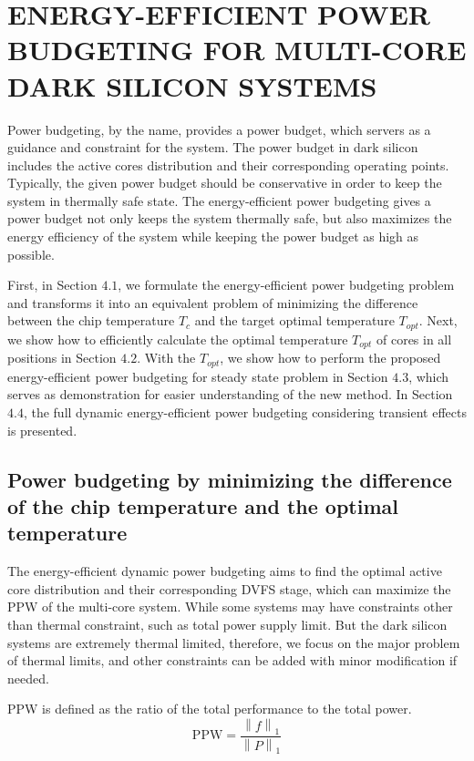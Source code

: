 \section{ENERGY-EFFICIENT POWER BUDGETING FOR MULTI-CORE DARK SILICON SYSTEMS}

Power budgeting, by the name, provides a power budget, which servers as a guidance and constraint for the system. The power budget in dark silicon includes the active cores distribution and their corresponding operating points. Typically, the given power budget should be conservative in order to keep the system in thermally safe state. The energy-efficient power budgeting gives a power budget not only keeps the system thermally safe, but also maximizes the energy efficiency of the system while keeping the power budget as high as possible. 

First, in Section $4.1$, we formulate the energy-efficient power budgeting problem and transforms it into an equivalent problem of minimizing the difference between the chip temperature $T_{c}$ and the target optimal temperature $T_{opt}$. Next, we show how to efficiently calculate the optimal temperature $T_{opt}$ of cores in all positions in Section $4.2$. With the $T_{opt}$, we show how to perform the proposed energy-efficient power budgeting for steady state problem in Section $4.3$, which serves as demonstration for easier understanding of the new method. In Section $4.4$, the full dynamic energy-efficient power budgeting considering transient effects is presented.

\subsection{Power budgeting by minimizing the difference of the chip temperature and the optimal temperature}
The energy-efficient dynamic power budgeting aims to find the optimal active core distribution and their corresponding DVFS stage, which can maximize the PPW of the multi-core system. While some systems may have constraints other than thermal constraint, such as total power supply limit. But the dark silicon systems are extremely thermal limited, therefore, we focus on the major problem of thermal limits, and other constraints can be added with minor modification if needed.

PPW is defined as the ratio of the total performance to the total power.
\begin{equation}\label{eq:ppw}
\text{PPW} = \frac{\left \| f \right \|_{1}}{\left \| P \right \|_{1}}
\end{equation}

